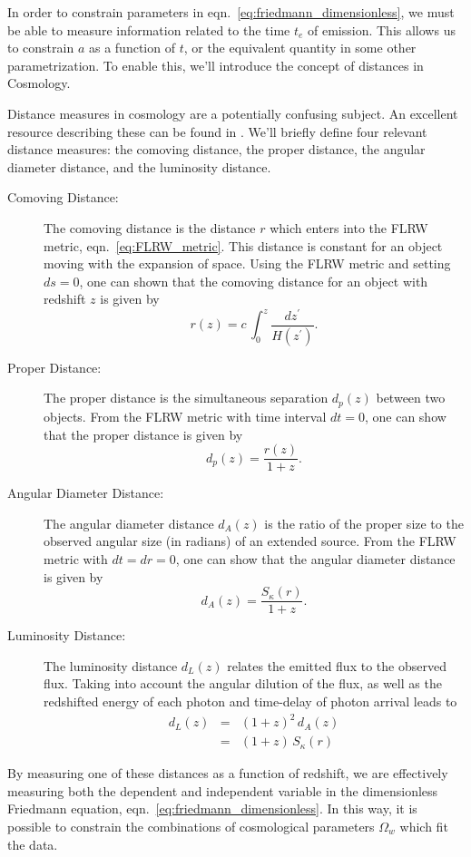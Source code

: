 In order to constrain parameters in
eqn.~\ref{eq:friedmann_dimensionless}, we must be able to measure
information related to the time $t_e$ of emission.  This allows us to
constrain $a$ as a function of $t$, or the equivalent quantity in some
other parametrization.  To enable this, we'll introduce the concept
of distances in Cosmology.

Distance measures in cosmology are a potentially confusing subject.  An
excellent resource describing these can be found in \citet{hogg1999distance}.
We'll briefly define four relevant distance measures: the comoving distance,
the proper distance, the angular diameter distance, and the luminosity
distance.

\begin{description}
  \item[Comoving Distance:] The comoving distance is the distance $r$ which
    enters into the FLRW metric, eqn.~\ref{eq:FLRW_metric}.  This distance is
    constant for an object moving with the expansion of space.  Using the
    FLRW metric and setting $ds=0$, one can shown that the comoving
    distance for an object with redshift $z$ is given by
    \begin{equation}
      \label{eq:comoving_distance}
      r(z) = c\,\int_0^z \frac{dz^\prime}{H(z^\prime)}.
    \end{equation}
  \item[Proper Distance:] The proper distance is the simultaneous separation
    $d_p(z)$ between two objects.  From the FLRW metric with time interval
    $dt=0$, one can show that the proper distance is given by
    \begin{equation}
      \label{eq:proper_distance}
      d_p(z) = \frac{r(z)}{1 + z}.
    \end{equation}
  \item[Angular Diameter Distance:] The angular diameter distance $d_A(z)$
    is the
    ratio of the proper size to the observed angular size (in radians) of
    an extended source.  From the FLRW metric with $dt = dr = 0$, one
    can show that the angular diameter distance is given by
    \begin{equation}
      \label{eq:angular_diameter_distance}
      d_A(z) = \frac{S_\kappa(r)}{1 + z}.
    \end{equation}
  \item[Luminosity Distance:] The luminosity distance $d_L(z)$ relates the
    emitted flux to the observed flux.  Taking into account the angular
    dilution of the flux, as well as the redshifted energy of each photon
    and time-delay of photon arrival leads to
    \begin{eqnarray}
      \label{eq:luminosity_distance}
      d_L(z) &=& (1 + z)^2\,d_A(z) \nonumber\\
      &=& (1 + z)\,S_\kappa(r)
    \end{eqnarray}
\end{description}
By measuring one of these distances as a function of redshift, we are
effectively measuring both the dependent and independent variable
in the dimensionless Friedmann equation, eqn.~\ref{eq:friedmann_dimensionless}.
In this way, it is possible to constrain the combinations of cosmological
parameters $\Omega_w$ which fit the data.

